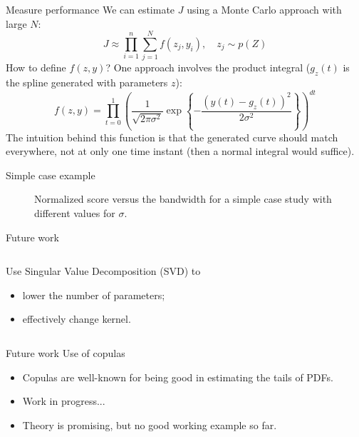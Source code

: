 \documentclass[aspectratio=\AspectR,10pt,compress,t]{beamer} %
\begin{document}
\begin{frame}{Measure performance}
	We can estimate $J$ using a Monte Carlo approach with large $N$:
	\begin{equation}
		J \approx \prod_{i=1}^n \sum_{j=1}^N f(z_j, y_i), \quad z_j \sim p(Z)
	\end{equation}
	How to define $f(z,y)$? \pause One approach involves the product integral ($g_z(t)$ is the spline generated with parameters $z$):
	\begin{equation}
		f(z, y) = \prod_{t=0}^1 \left( \frac{1}{\sqrt{2\pi\sigma^2}} \exp \left\{ -\frac{\left(y(t) - g_z(t)\right)^2}{2\sigma^2} \right\} \right)^{dt}
	\end{equation}
	The intuition behind this function is that the generated curve should match everywhere, not at only one time instant (then a normal integral would suffice).
\end{frame}

\begin{frame}{Simple case example}
	\begin{figure}
		\centering
		
		\vspace{-0.5em}
		\caption{Normalized score versus the bandwidth for a simple case study with different values for $\sigma$.}
	\end{figure}
\end{frame}

\begin{frame}{Future work}
	\begin{columns}
		\begin{column}{0.46\textwidth}
			Use Singular Value Decomposition (SVD) to
			\begin{itemize}
				\item lower the number of parameters;
				\item effectively change kernel.
			\end{itemize}
		\end{column}
		\begin{column}{0.55\textwidth}
			\begin{figure}
				\vspace{-2em}
				
			\end{figure}
		\end{column}
	\end{columns}
\end{frame}

\begin{frame}{Future work}
	Use of copulas \cite{Schmidt2007, scaillet2007estimationcopulas, aas2009paircopula}
	\begin{itemize}
		\item Copulas are well-known for being good in estimating the tails of PDFs.
		\item Work in progress...
		\item Theory is promising, but no good working example so far.
	\end{itemize}
\end{frame}
\end{document}
